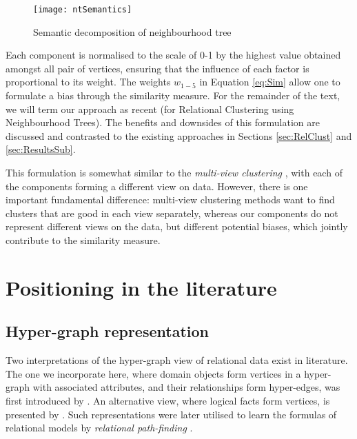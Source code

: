 	\begin{figure}
		\centering
		\texttt{[image: ntSemantics]}
		\caption{Semantic decomposition of neighbourhood tree\label{fig:ntsemantics}}
	\end{figure}

Each component is normalised to the scale of 0-1 by the highest value obtained amongst all pair of vertices, ensuring that the influence of each factor is proportional to its weight.
The weights $w_{1-5}$ in Equation \ref{eq:Sim} allow one to formulate a bias through the similarity measure.
For the remainder of the text, we will term our approach as \gls{recent} (for Relational Clustering using Neighbourhood Trees).
The benefits and downsides of this formulation are discussed and contrasted to the existing approaches in Sections \ref{sec:RelClust} and \ref{sec:ResultsSub}.


This formulation is somewhat similar to the \textit{multi-view clustering} \cite{Bickel:2004}, with each of the components forming a different view on data.
However, there is one important fundamental difference: multi-view clustering methods want to find clusters that are good in each view separately, whereas our components do not represent different views on the data, but different potential biases, which jointly contribute to the similarity measure.


\section{Positioning in the literature}


\subsection{Hyper-graph representation}

Two interpretations of the hyper-graph view of relational data exist in literature.
The one we incorporate here, where domain objects form vertices in a hyper-graph with associated attributes, and their relationships form hyper-edges, was first introduced by \cite{Richards:92AAb}.
An alternative view, where logical facts form vertices, is presented by \cite{Ong2005}.
Such representations were later utilised to learn the formulas of relational models by \textit{relational path-finding} \cite{kok2010motifs,Richards:92AAb,Ong2005,Lovasz1996}.



